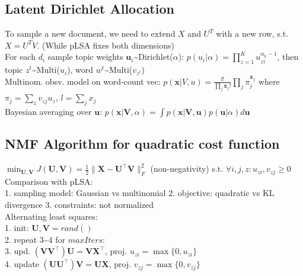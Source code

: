 \subsection*{Latent Dirichlet Allocation}
To sample a new document, we need to extend $X$ and $U^T$ with a new row, s.t. $X=U^T V$. (While pLSA fixes both dimensions)\\
For each $d_i$ sample topic weights $\mathbf{u}_i$\textasciitilde Dirichlet($\alpha$): $p(u_i|\alpha) = \prod_{z=1}^K u_{zi}^{\alpha_k-1}$, then topic $z^t$\textasciitilde Multi($u_i$), word $w^t$\textasciitilde Multi($v_{z^t}$)\\
Multinom. obsv. model on word-count vec: $p(\mathbf{x}|V,u) = \frac{l!}{\prod_j \mathbf{x}_j!}\prod_j \pi_j^{\mathbf{x}_j}$ 
where $\pi_j=\sum_z v_{zj} u_z$, $l=\sum_j x_j$ \\
Bayesian averaging over $\mathbf{u}$: $p(\mathbf{x}|\mathbf{V},\alpha)=\int p(\mathbf{x}|\mathbf{V},\mathbf{u})p(\mathbf{u}|\alpha)d\mathbf{u}$

\subsection*{NMF Algorithm for quadratic cost function}

$\min_{\mathbf{U}, \mathbf{V}} J(\mathbf{U}, \mathbf{V}) = \frac{1}{2} \|\mathbf{X} - \mathbf{U}^\top\mathbf{V}\|_F^2$ (non-negativity)
s.t. $\forall i,j,z:u_{zi},v_{zj} \geq 0 $ \\
Comparison with pLSA:\\
1. sampling model: Gaussian vs multinomial
2. objective: quadratic vs KL divergence
3. constraints: not normalized \\
Alternating least squares:\\
1. init: $\mathbf{U}, \mathbf{V} = rand()$\\ 2. repeat 3\textasciitilde4 for $\mathit{maxIters}$:\\
3. upd. $(\mathbf{VV}^\top)\mathbf{U} = \mathbf{VX}^\top$, proj. $u_{zi} = \max \{ 0, u_{zi} \}$\\
4. update $(\mathbf{UU}^\top)\mathbf{V} = \mathbf{UX}$, proj. $v_{zj} = \max \{ 0, v_{zj} \}$
